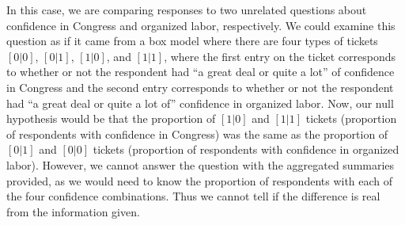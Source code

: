 \documentclass[11pt]{article}
\begin{document}
\noindent In this case, we are comparing responses to two unrelated questions about confidence in Congress and organized labor, respectively. We could examine this question as if it came from a box model where there are four types of tickets $ [0|0] $, $ [0|1] $, $ [1|0] $, and $ [1|1] $, where the first entry on the ticket corresponds to whether or not the respondent had ``a great deal or quite a lot'' of confidence in Congress and the second entry corresponds to whether or not the respondent had ``a great deal or quite a lot of'' confidence in organized labor. Now, our null hypothesis would be that the proportion of $[1|0]$ and $[1|1]$ tickets (proportion of respondents with confidence in Congress) was the same as the proportion of $[0|1]$ and $[0|0]$ tickets (proportion of respondents with confidence in organized labor). However, we cannot answer the question with the aggregated summaries provided, as we would need to know the proportion of respondents with each of the four confidence combinations. Thus we cannot tell if the difference is real from the information given.
%
\\

\end{document}
